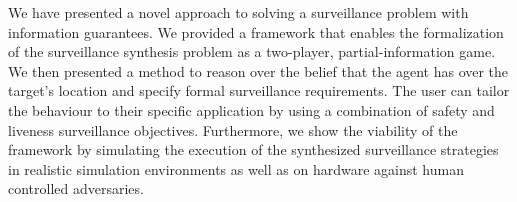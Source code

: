 %
%



We have presented a novel approach to solving a surveillance problem with information guarantees. We provided a framework that enables the  formalization of the surveillance synthesis problem as a two-player, partial-information game. We then presented a method to reason over the belief that the agent has over the target's location and specify formal surveillance requirements. The user can tailor the behaviour to their specific application by using a combination of safety and liveness surveillance objectives. Furthermore, we show the viability of the framework by simulating the execution of the synthesized surveillance strategies in realistic simulation environments as well as on hardware against human controlled adversaries.

